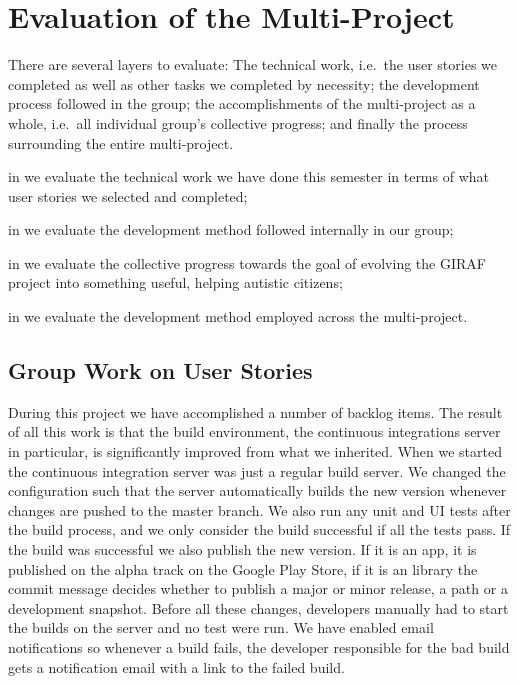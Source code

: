 \chapter{Evaluation of the Multi-Project}\label{chap:evaluation}

There are several layers to evaluate: The technical work, i.e.\ the user stories we completed as well as other tasks we completed by necessity; the development process followed in the group; the accomplishments of the multi-project as a whole, i.e.\ all individual group's collective progress; and finally the process surrounding the entire multi-project. 

\begin{chapterorganization}
  \item in  we evaluate the technical work we have done this semester in terms of what user stories we selected and completed;
  \item in  we evaluate the development method followed internally in our group;
  \item in  we evaluate the collective progress towards the goal of evolving the GIRAF project into something useful, helping autistic citizens;
  \item in  we evaluate the development method employed across the multi-project.
\end{chapterorganization}

\section{Group Work on User Stories}\label{conc:userstories}

During this project we have accomplished a number of backlog items. The result of all this work is that the build environment, the continuous integrations server in particular, is significantly improved from what we inherited. When we started the continuous integration server was just a regular build server. We changed the configuration such that the server automatically builds the new version whenever changes are pushed to the master branch. We also run any unit and UI tests after the build process, and we only consider the build successful if all the tests pass. If the build was successful we also publish the new version. If it is an app, it is published on the alpha track on the Google Play Store, if it is an library the commit message decides whether to publish a major or minor release, a path or a development snapshot. Before all these changes, developers manually had to start the builds on the server and no test were run. We have enabled email notifications so whenever a build fails, the developer responsible for the bad build gets a notification email with a link to the failed build.

